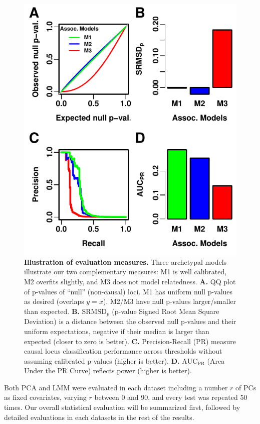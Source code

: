 \documentclass[11pt]{article}
\newcommand{\rmsd}{\text{SRMSD}_p}
\newcommand{\auc}{\text{AUC}_\text{PR}}
\begin{document}
\begin{figure}[bp!]
  \centering
  \includegraphics{sim-n1000-k10-f0.1-s0.5-g1/measures-illustration.pdf}
  \caption{
    {\bf Illustration of evaluation measures.}
    Three archetypal models illustrate our two complementary measures:
    M1 is well calibrated, M2 overfits slightly, and M3 does not model relatedness.
    \textbf{A.}
    QQ plot of p-values of ``null'' (non-causal) loci.
    M1 has uniform null p-values as desired (overlaps $y=x$).
    M2/M3 have null p-values larger/smaller than expected.
    \textbf{B.}
    $\rmsd$ (p-value Signed Root Mean Square Deviation) is a distance between the observed null p-values and their uniform expectations, negative if their median is larger than expected (closer to zero is better).
    \textbf{C.}
    Precision-Recall (PR) measure causal locus classification performance across thresholds without assuming calibrated p-values (higher is better).
    \textbf{D.}
    $\auc$ (Area Under the PR Curve) reflects power (higher is better).
  }
  \label{fig:measures_illustration}
\end{figure}

Both PCA and LMM were evaluated in each dataset including a number $r$ of PCs as fixed covariates, varying $r$ between 0 and 90, and every test was repeated 50 times.
Our overall statistical evaluation will be summarized first, followed by detailed evaluations in each datasets in the rest of the results.
\end{document}
